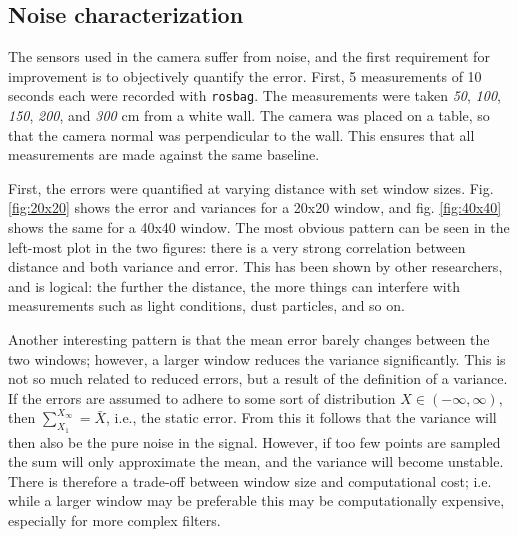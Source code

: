 \documentclass[11pt]{article}
\begin{document}
 

\subsection{Noise characterization}
The sensors used in the camera suffer from noise, and the first requirement for improvement is to objectively quantify the error. First, 5 measurements of 10 seconds each were recorded with \texttt{rosbag}. The measurements were taken \emph{50}, \emph{100}, \emph{150}, \emph{200}, and \emph{300} cm from a white wall. The camera was placed on a table, so that the  camera normal was perpendicular to the wall. This ensures that all measurements are made against the same baseline. \par

First, the errors were quantified at varying distance with set window sizes. Fig. \vref{fig:20x20} shows the error and variances for a 20x20 window, and fig. \vref{fig:40x40} shows the same for a 40x40 window. The most obvious pattern can be seen in the left-most plot in the two figures: there is a very strong correlation between distance and both variance and error. This has been shown by other researchers, and is logical: the further the distance, the more things can interfere with measurements such as light conditions, dust particles, and so on. \par

Another interesting pattern is that the mean error barely changes between the two windows; however, a larger window reduces the variance significantly. This is not so much related to reduced errors, but a result of the definition of a variance. If the errors are assumed to adhere to some sort of distribution $X \in \left(-\infty, \infty \right)$, then $\sum_{X_1}^{X_\infty} = \bar{X}$, i.e., the static error. From this it follows that the variance will then also be the pure noise in the signal. However, if too few points are sampled the sum will only approximate the mean, and the variance will become unstable. There is therefore a trade-off between window size and computational cost; i.e. while a larger window may be preferable this may be computationally expensive, especially for more complex filters. \par
\end{document}

